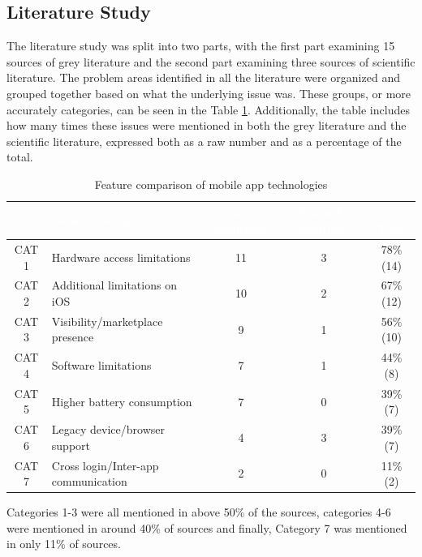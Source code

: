 \documentclass[a4paper,12pt]{article}
\begin{document}
\subsection{Literature Study}
\label{Results_study}
The literature study was split into two parts, with the first part examining 15 sources of grey literature and the second part examining three sources of scientific literature. The problem areas identified in all the literature were organized and grouped together based on what the underlying issue was. These groups, or more accurately categories, can be seen in the Table \ref{tab:lit_study_result}. Additionally, the table includes how many times these issues were mentioned in both the grey literature and the scientific literature, expressed both as a raw number and as a percentage of the total.

\begin{table}[h]
    \centering
    \begin{tabular}{|c|p{5.5cm}|c|c|c|}
        \hline
        \rowcolor[HTML]{656565} \multicolumn{1}{|p{1.5cm}|}{\textcolor{white}{ Category}} & {\textcolor{white}{\quad \quad Issue/problem area}} & \multicolumn{1}{p{1.6cm}|}{\textcolor{white}{\quad Grey mentions}} & \multicolumn{1}{p{1.65cm}|}{\textcolor{white}{Scientific mentions}} & \multicolumn{1}{p{1.6cm}|}{\textcolor{white}{$\;\;$ Total}} \\ \hline
        CAT 1 & Hardware access limitations & 11 & 3 & 78\% (14)  \\
        CAT 2 & Additional limitations on iOS & 10 & 2 & 67\% (12)  \\
        CAT 3 & Visibility/marketplace presence & 9 & 1 & 56\% (10)  \\
        CAT 4 & Software limitations & 7 & 1 & 44\% (8)  \\
        CAT 5 & Higher battery consumption & 7 & 0 & 39\% (7)  \\
        CAT 6 & Legacy device/browser support & 4 & 3 & 39\% (7)  \\
        CAT 7 & Cross login/Inter-app communication & 2 & 0 & 11\% (2)  \\
        \hline
    \end{tabular}
    \caption{Feature comparison of mobile app technologies}
    \label{tab:lit_study_result}
\end{table}

Categories 1-3 were all mentioned in above 50\% of the sources, categories 4-6 were mentioned in around 40\% of sources and finally, Category 7 was mentioned in only 11\% of sources.
\end{document}
